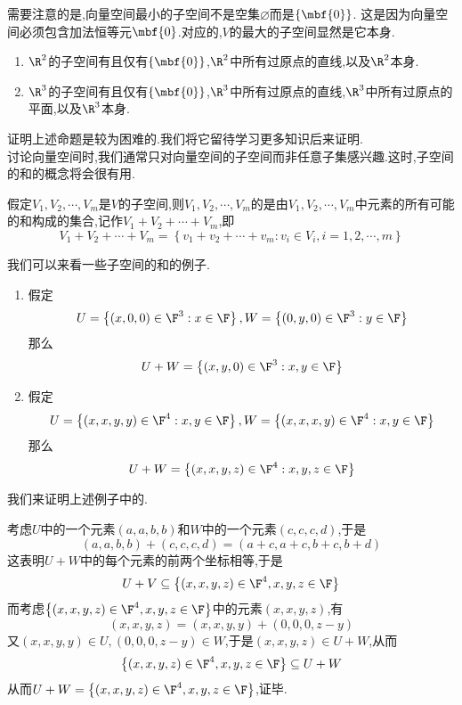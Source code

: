 \documentclass{ctexart}
\begin{document}
需要注意的是,向量空间最小的子空间不是空集$\varnothing$而是$\left\{\mbf{0}\right\}$.
这是因为向量空间必须包含加法恒等元$\mbf{0}$.对应的,$V$的最大的子空间显然是它本身.
\begin{problem}[1.3.2 $\R^2$和$\R^3$的子空间]
    \begin{enumerate}[label=\textbf{(\alph*)}]
        \item $\R^2$的子空间有且仅有$\left\{\mbf{0}\right\}$,$\R^2$中所有过原点的直线,以及$\R^2$本身.
        \item $\R^3$的子空间有且仅有$\left\{\mbf{0}\right\}$,$\R^3$中所有过原点的直线,$\R^3$中所有过原点的平面,以及$\R^3$本身.
    \end{enumerate}
\end{problem}\noindent
证明上述命题是较为困难的.我们将它留待学习更多知识后来证明.\\
讨论向量空间时,我们通常只对向量空间的子空间而非任意子集感兴趣.这时,子空间的和的概念将会很有用.
\begin{definition}[1.4 定义:子空间的和]
    假定$V_1,V_2,\cdots,V_m$是$V$的子空间,则$V_1,V_2,\cdots,V_m$的是由$V_1,V_2,\cdots,V_m$中元素的所有可能的和构成的集合,记作$V_1+V_2+\cdots+V_m$,即
    $$V_1+V_2+\cdots+V_m=\left\{v_1+v_2+\cdots+v_m:v_i\in V_i,i=1,2,\cdots,m\right\}$$
\end{definition}\noindent
我们可以来看一些子空间的和的例子.
\begin{problem}[1.4.1 例:子空间的和]
    \begin{enumerate}[label=\textbf{(\alph*)}]
        \item 假定$$U=\left\{(x,0,0)\in\F^3:x\in\F\right\},W=\left\{(0,y,0)\in\F^3:y\in\F\right\}$$
            那么$$U+W=\left\{(x,y,0)\in\F^3:x,y\in\F\right\}$$
        \item 假定$$U=\left\{(x,x,y,y)\in\F^4:x,y\in\F\right\},W=\left\{(x,x,x,y)\in\F^4:x,y\in\F\right\}$$
            那么$$U+W=\left\{(x,x,y,z)\in\F^4:x,y,z\in\F\right\}$$
    \end{enumerate}
\end{problem}\noindent
我们来证明上述例子中的.
\begin{problem}[1.4.1(b) Proof.]
    考虑$U$中的一个元素$(a,a,b,b)$和$W$中的一个元素$(c,c,c,d)$,于是
    $$(a,a,b,b)+(c,c,c,d)=(a+c,a+c,b+c,b+d)$$
    这表明$U+W$中的每个元素的前两个坐标相等,于是
    $$U+V\subseteq\left\{(x,x,y,z)\in\F^4,x,y,z\in\F\right\}$$
    而考虑$\left\{(x,x,y,z)\in\F^4,x,y,z\in\F\right\}$中的元素$(x,x,y,z)$,有
    $$(x,x,y,z)=(x,x,y,y)+(0,0,0,z-y)$$
    又$(x,x,y,y)\in U,(0,0,0,z-y)\in W$,于是$(x,x,y,z)\in U+W$,从而
    $$\left\{(x,x,y,z)\in\F^4,x,y,z\in\F\right\}\subseteq U+W$$
    从而$U+W=\left\{(x,x,y,z)\in\F^4,x,y,z\in\F\right\}$,证毕.
\end{problem}\noindent
\end{document}
